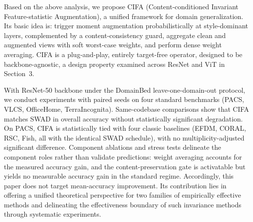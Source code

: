 \documentclass[electronics,article,submit,moreauthors]{Definitions/mdpi}
\newcommand{\add}[1]{\textcolor{addblue}{#1}}
\newcommand{\del}[1]{\textcolor{delred}{\st{#1}}}
\def\add#1{#1}
\def\del#1{}
\begin{document}
Based on the above analysis, we propose CIFA (Content-conditioned Invariant Feature-statistic Augmentation), a unified framework for domain generalization. Its basic idea is: trigger moment augmentation probabilistically at style-dominant layers, complemented by a content-consistency guard, aggregate clean and augmented views with soft worst-case weights, and perform dense weight averaging. CIFA is a plug-and-play, entirely target-free operator, designed to be backbone-agnostic, a design property examined across ResNet and ViT in Section~3.

With ResNet-50 backbone under the DomainBed leave-one-domain-out protocol, we conduct experiments with paired seeds on four standard benchmarks (PACS, VLCS, OfficeHome, TerraIncognita). Same-codebase comparisons show that CIFA matches SWAD in overall accuracy without statistically significant degradation. On PACS, CIFA is \del{statistically equivalent to}\add{statistically tied with} four classic baselines (EFDM, CORAL, RSC, Fish, all with the identical SWAD schedule)\add{, with no multiplicity-adjusted significant difference}. Component ablations and stress tests delineate the component roles rather than validate predictions: weight averaging accounts for the measured accuracy gain, and the content-preservation gate is activatable but yields no measurable accuracy gain in the standard regime. Accordingly, this paper does not target mean-accuracy improvement. Its contribution lies in offering a unified theoretical perspective for two families of empirically effective methods and delineating the effectiveness boundary of such invariance methods through systematic experiments.
\end{document}
